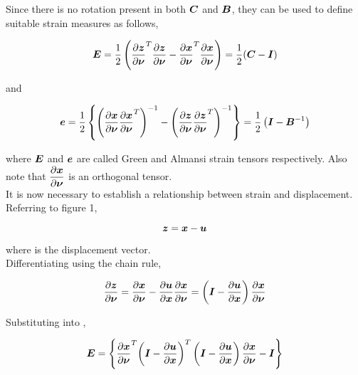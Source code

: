 Since there is no rotation present in both $\matr{C}$ and $\matr{B}$, they can be used to define suitable strain measures as follows,

\begin{equation}
  \matr{E}=\frac{1}{2}\pbrac{\transpose{\delby{\vect{z}}{\vect{\nu}}}\delby{\vect{z}}{\vect{\nu}}-
                       \transpose{\delby{\vect{x}}{\vect{\nu}}}\delby{\vect{x}}{\vect{\nu}}}=
	    \frac{1}{2}(\matr{C}-\matr{I})	       
  \label{eqn:greenstrain}
\end{equation}

\noindent and

\begin{equation}
  \vect{e}=\frac{1}{2}\bbrac{\pbrac{\delby{\vect{x}}{\vect{\nu}}\transpose{\delby{\vect{x}}{\vect{\nu}}}}^{-1}-
                             \pbrac{\delby{\vect{z}}{\vect{\nu}}\transpose{\delby{\vect{z}}{\vect{\nu}}}}^{-1}}=
			     \frac{1}{2}\pbrac{\matr{I}-\matr{B}^{-1}}  
  \label{eqn:almansistrain}
\end{equation}

\noindent where $\matr{E}$ and $\vect{e}$ are called Green and Almansi strain tensors respectively. 
Also note that $\delby{\vect{x}}{\vect{\nu}}$ is an orthogonal tensor. \\

It is now necessary to establish a relationship between strain and displacement. Referring to figure 1, 

\begin{equation}
  \vect{z}=\vect{x}-\vect{u}
  \label{eqn:displacement}
\end{equation}

\noindent where  is the displacement vector. \\

\noindent Differentiating  using the chain rule,

\begin{equation}
  \delby{\vect{z}}{\vect{\nu}}=\delby{\vect{x}}{\vect{\nu}}-\delby{\vect{u}}{\vect{x}}\delby{\vect{x}}{\vect{\nu}}=
                               \pbrac{\matr{I}-\delby{\vect{u}}{\vect{x}}}\delby{\vect{x}}{\vect{\nu}}  
  \label{eqn:displacementgradient}
\end{equation}

\noindent Substituting  into ,

\begin{equation}
  \matr{E}=\bbrac{\transpose{\delby{\vect{x}}{\vect{\nu}}}\transpose{\pbrac{\matr{I}-\delby{\vect{u}}{\vect{x}}}}
                  \pbrac{\matr{I}-\delby{\vect{u}}{\vect{x}}}\delby{\vect{x}}{\vect{\nu}}-\matr{I}}
  \label{eqn:greendisplacement1}
\end{equation}

